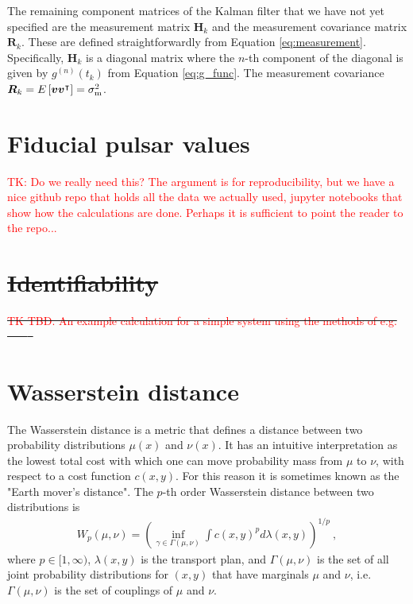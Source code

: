 \documentclass[fleqn,usenatbib,useAMS]{mnras}
\providecommand{\DIFdel}[1]{{\protect\color{red}\sout{#1}}}                      %
\providecommand{\DIFdelbegin}{} %
\providecommand{\DIFdelend}{} %
\newcommand{\DIFscaledelfig}{0.5}
\newlength{\DIFdelgraphicswidth} %
\newlength{\DIFdelgraphicsheight} %
\newcommand{\DIFdelincludegraphics}[2][]{%
\sbox{\DIFdelgraphicsbox}{\DIFOincludegraphics[#1]{#2}}%
\settoboxwidth{\DIFdelgraphicswidth}{\DIFdelgraphicsbox} %
\settoboxtotalheight{\DIFdelgraphicsheight}{\DIFdelgraphicsbox} %
\scalebox{\DIFscaledelfig}{%
\parbox[b]{\DIFdelgraphicswidth}{\usebox{\DIFdelgraphicsbox}\\[-\baselineskip] \rule{\DIFdelgraphicswidth}{0em}}\llap{\resizebox{\DIFdelgraphicswidth}{\DIFdelgraphicsheight}{%
\setlength{\unitlength}{\DIFdelgraphicswidth}%
\begin{picture}(1,1)%
\thicklines\linethickness{2pt} %
{\color[rgb]{1,0,0}\put(0,0){\framebox(1,1){}}}%
{\color[rgb]{1,0,0}\put(0,0){\line( 1,1){1}}}%
{\color[rgb]{1,0,0}\put(0,1){\line(1,-1){1}}}%
\end{picture}%
}\hspace*{3pt}}} %
} %
\DeclareRobustCommand{\DIFdelbegin}{\DIFOdelbegin \let\includegraphics\DIFdelincludegraphics} %
\DeclareRobustCommand{\DIFdelend}{\DIFOaddend \let\includegraphics\DIFOincludegraphics} %
\begin{document}
The remaining component matrices of the Kalman filter that we have not yet specified are the measurement matrix $\boldsymbol{H}_k$ and the measurement covariance matrix $\boldsymbol{R}_k$. These are defined straightforwardly from Equation \eqref{eq:measurement}. Specifically, 
$\boldsymbol{H}_k$ is a diagonal matrix where the $n$-th component of the diagonal is given by $g^{(n)}(t_k)$ from Equation \eqref{eq:g_func}. The measurement covariance $\boldsymbol{R}_k = E \left[ \boldsymbol{v} \boldsymbol{v}^\intercal \right] = \sigma^2_{\rm m}$.



\section{Fiducial pulsar values}\label{appendix_fiducial}
\textcolor{red}{TK: Do we really need this? The argument is for reproducibility, but we have a nice github repo that holds all the data we actually used, jupyter notebooks that show how the calculations are done. Perhaps it is sufficient to point the reader to the repo... } 
\DIFdelbegin \section{\DIFdel{Identifiability}}%
\addtocounter{section}{-1}%
\DIFdel{\textcolor{red}{TK TBD. An example calculation for a simple system using the methods of e.g. } \mbox{%
\citep{KARLSSON2012941} }\hskip0pt%
\mbox{%
\citep{SEDOGLAVIC2002735}
}\hskip0pt%
}\DIFdelend 

\section{Wasserstein distance}\label{sec:wasserstein}
The Wasserstein distance is a metric that defines a distance between two probability distributions $\mu(x)$ and $\nu(x)$. It has an intuitive interpretation as the lowest total cost with which one can move probability mass from $\mu$ to $\nu$, with respect to a cost function $c(x,y)$. For this reason it is sometimes known as the "Earth mover's distance". The $p$-th order Wasserstein distance between two distributions is
\begin{eqnarray}
	W_p(\mu,\nu)= \left( \inf_{\gamma \in \Gamma(\mu, \nu)}  \int c(x,y)^p d \lambda (x,y)\right)^{1/p} \label{eq:wasserstein} \ ,
\end{eqnarray}
where $p \in [1,\infty)$, $\lambda(x,y)$ is the transport plan, and $\Gamma(\mu, \nu)$ is the set of all joint probability distributions for $(x,y)$ that have marginals $\mu$ and $\nu$, i.e. $\Gamma(\mu, \nu)$ is the set of couplings of $\mu$ and $\nu$. 
\end{document}
